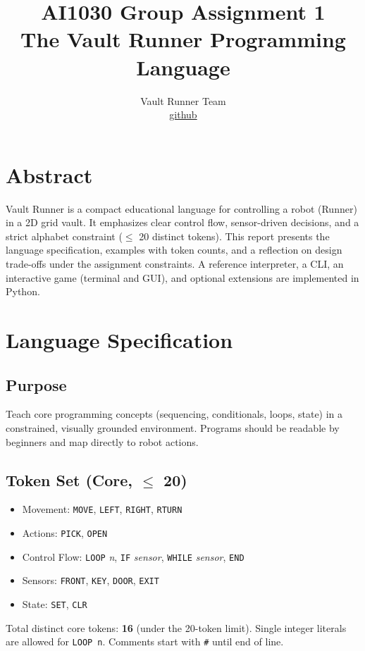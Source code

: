 \documentclass[11pt,a4paper]{article}
\title{AI1030 Group Assignment 1\\The Vault Runner Programming Language}
\author{Vault Runner Team \\ \href{https://github.com/rm-rf-humans/scratch_prog_lang}{github}}
\date{}
\begin{document}
\maketitle

\section*{Abstract}
Vault Runner is a compact educational language for controlling a robot (Runner) in a 2D grid vault. It emphasizes clear control flow, sensor-driven decisions, and a strict alphabet constraint (\(\leq\) 20 distinct tokens). This report presents the language specification, examples with token counts, and a reflection on design trade-offs under the assignment constraints. A reference interpreter, a CLI, an interactive game (terminal and GUI), and optional extensions are implemented in Python.

\section{Language Specification}
\subsection{Purpose}
Teach core programming concepts (sequencing, conditionals, loops, state) in a constrained, visually grounded environment. Programs should be readable by beginners and map directly to robot actions.

\subsection{Token Set (Core, \(\leq\) 20)}
\begin{itemize}[noitemsep]
  \item Movement: \texttt{MOVE}, \texttt{LEFT}, \texttt{RIGHT}, \texttt{RTURN}
  \item Actions: \texttt{PICK}, \texttt{OPEN}
  \item Control Flow: \texttt{LOOP} \textit{n}, \texttt{IF} \textit{sensor}, \texttt{WHILE} \textit{sensor}, \texttt{END}
  \item Sensors: \texttt{FRONT}, \texttt{KEY}, \texttt{DOOR}, \texttt{EXIT}
  \item State: \texttt{SET}, \texttt{CLR}
\end{itemize}
Total distinct core tokens: \textbf{16} (under the 20-token limit). Single integer literals are allowed for \texttt{LOOP n}. Comments start with \texttt{\#} until end of line.
\end{document}

